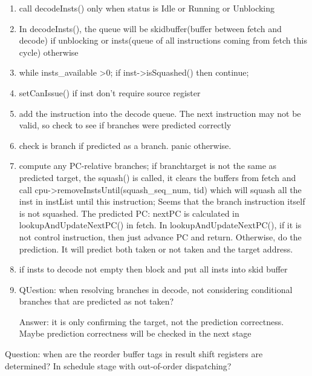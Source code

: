 \documentclass[11pt]{article}
\begin{document}
\begin{enumerate}
	\item call decodeInsts() only when status is Idle or Running or Unblocking
	
	\item In decodeInsts(), the queue will be skidbuffer(buffer between fetch and decode) if unblocking or insts(queue of all instructions coming from fetch this cycle) otherwise
	
	\item while insts\_available \textgreater 0; if inst-\textgreater isSquashed() then continue;
	
	\item setCanIssue() if inst don't require source register

	\item add the instruction into the decode  queue.  The next instruction may not be valid, so check to see if branches were predicted correctly
	
	\item check is branch if predicted as a branch. panic otherwise.
	
	\item compute any PC-relative branches; if branchtarget is not the same as predicted target, the squash() is called, it clears the buffers from fetch and call cpu-\textgreater removeInstsUntil(squash\_seq\_num, tid) which will squash all the inst in instList until this instruction; Seems that the branch instruction itself is not squashed. The predicted PC: nextPC is calculated in lookupAndUpdateNextPC() in fetch. In lookupAndUpdateNextPC(), if it is not control instruction, then just advance PC and return. Otherwise, do the prediction. It will predict both taken or not taken and the target address.
	
	\item if insts to decode not empty then block and put all insts into skid buffer
	
	\item QUestion: when resolving branches in decode, not considering conditional branches that are predicted as not taken?
	
	Answer: it is only confirming the target, not the prediction correctness. Maybe prediction correctness will be checked in the next stage

\end{enumerate}

Question: when are the reorder buffer tags in result shift registers are determined? In schedule stage with out-of-order dispatching?\\
\end{document}
